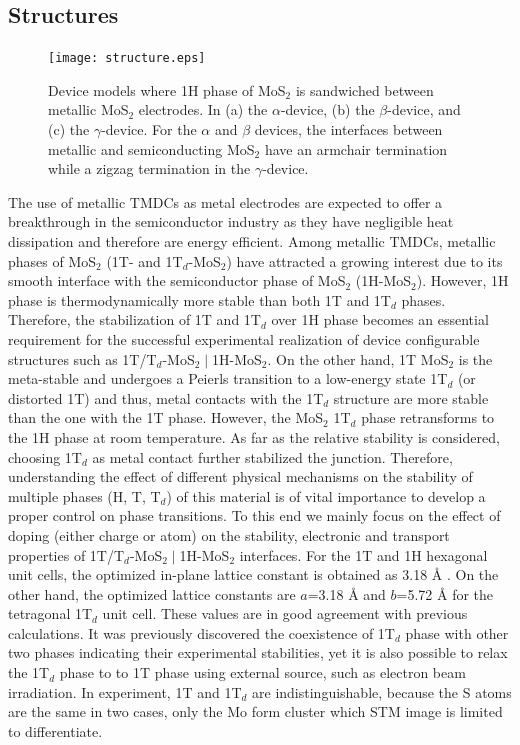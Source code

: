 \subsection{Structures}

\begin{figure}[htb]
\centering
\texttt{[image: structure.eps]}%
\caption{\label{structure-1t}  Device models where 1H phase of MoS$_2$ is sandwiched between metallic MoS$_2$ electrodes. In (a) the $\alpha$-device, (b) the $\beta$-device, and (c)
the $\gamma$-device. For the $\alpha$ and $\beta$ devices, 
the interfaces between metallic and semiconducting MoS$_2$ have an armchair termination while a zigzag termination in the $\gamma$-device. }
\end{figure}

The use of metallic TMDCs as metal electrodes are expected to offer a breakthrough in the semiconductor industry as they have negligible heat dissipation and therefore are energy efficient. Among metallic TMDCs, metallic phases of MoS$_2$ (1T- and 1T$_d$-MoS$_2$) have attracted a growing interest due to its smooth interface with  the semiconductor phase of MoS$_2$ (1H-MoS$_2$). 
However, 1H phase is thermodynamically more stable than both 1T and 1T$_d$ phases. Therefore, the stabilization of 1T and 1T$_d$  over 1H phase becomes an essential requirement for the successful experimental realization of device configurable structures such as 1T/T$_d$-MoS$_{2}\mid$1H-MoS$_2$. On the other hand, 1T MoS$_2$ is the meta-stable and undergoes a Peierls transition to a low-energy state 1T$_d$ (or distorted 1T) and thus, metal contacts with the 1T$_d$ structure are more stable than the one with the 1T phase. However, the MoS$_2$ 1T$_d$ phase retransforms to the 1H phase at room temperature. 
As far as the relative stability is considered, choosing 1T$_d$ as metal contact further stabilized the junction.
Therefore, understanding the effect of different physical mechanisms on the stability of multiple phases (H, T, T$_d$) of this material is of vital importance to develop a proper control on phase transitions. To this end we mainly focus on the effect of doping (either charge or atom) on the stability, electronic and transport properties of 1T/T$_d$-MoS$_2\mid$1H-MoS$_2$ interfaces.  For the 1T and 1H hexagonal unit cells, the optimized in-plane lattice constant is obtained as 3.18 {\AA} .  On the other hand, the optimized lattice constants are $a$=3.18 {\AA}  and  $b$=5.72 {\AA} for  the tetragonal 1T$_d$ unit cell. 
These values are in good agreement with previous calculations\cite{C5NR07715J}. It was previously discovered the coexistence of 1T$_d$ phase with other two phases indicating their experimental stabilities, yet it is also possible to  relax the 1T$_d$ phase to to 1T phase using external source, such as electron beam irradiation\cite{Eda2012}. 
In experiment, 1T and 1T$_d$ are indistinguishable, because the S atoms are the same in two cases, only the Mo form cluster which STM image is limited to differentiate.

